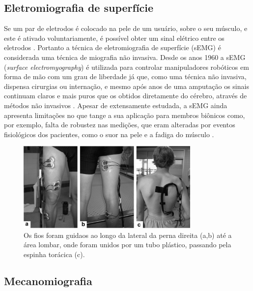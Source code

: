 \subsection{Eletromiografia de superfície}\label{cap2:sub2.3}

Se um par de eletrodos é colocado na pele de um usuário, sobre o seu músculo, e este é ativado voluntariamente, é possível obter um sinal elétrico entre os eletrodos \cite{merletti2001surface}. Portanto a técnica de eletromiografia de superfície (sEMG) é considerada uma técnica de miografia não invasiva. Desde os anos 1960 a sEMG (\textit{surface electromyography}) é utilizada para controlar manipuladores robóticos em forma de mão com um grau de liberdade já que, como uma técnica não invasiva, dispensa cirurgias ou internação, e mesmo após anos de uma amputação os sinais continuam claros e mais puros que os obtidos diretamente do cérebro, através de métodos não invasivos \cite{castellini2014proceedings}. Apesar de extensamente estudada, a sEMG ainda apresenta limitações no que tange a sua aplicação para membros biônicos como, por exemplo, falta de robustez nas medições, que eram alteradas por eventos fisiológicos dos pacientes, como o suor na pele e a fadiga do músculo \cite{castellini2014proceedings}.

\begin{figure}[H]
\centering
\includegraphics[width = 0.8\textwidth]{img/Silvers2009_sEMG.JPG}
\caption[Montagem Para Testes de Contração Muscular Submerso em Água]{Os fios foram guidaos ao longo da lateral da perna direita (a,b) até a área lombar, onde foram unidos por um tubo plástico, passando pela espinha torácica (c)\cite{silvers2011comparison}.}
\label{Silvers2009_sEMG}
\end{figure}
		

\subsection{Mecanomiografia}\label{cap2:sub2.4}

